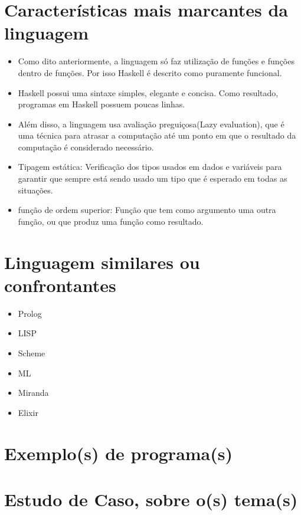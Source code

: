 \documentclass[
	article,			%
	11pt,				%
	oneside,			%
	a4paper,			%
	english,			%
	brazil,				%
	sumario=tradicional
	]{abntex2}
\begin{document}
    \chapter{Características mais marcantes da linguagem}

    \begin{itemize}
      \item Como dito anteriormente, a linguagem só faz utilização de funções e funções dentro de funções. Por isso
      Haskell é descrito como puramente funcional.
      \item Haskell possui uma sintaxe simples, elegante e concisa. Como resultado, programas em Haskell possuem 
      poucas linhas. 
      \item Além disso, a linguagem usa avaliação preguiçosa(Lazy evaluation), que é uma técnica para atrasar a computação 
      até um ponto em que o resultado da computação é considerado necessário.
      \item Tipagem estática: Verificação dos tipos usados em dados e variáveis para 
      garantir que sempre está sendo usado um tipo que é esperado em todas as situações. 
      \item função de ordem superior: Função que tem como argumento uma outra função, ou que produz 
      uma função como resultado.
    \end{itemize}

    \chapter{Linguagem similares ou confrontantes}

    \begin{itemize}
      \item Prolog
      \item LISP 
      \item Scheme 
      \item ML 
      \item Miranda 
      \item Elixir 
    \end{itemize}

    \chapter{Exemplo(s) de programa(s)}
    \chapter{Estudo de Caso, sobre o(s) tema(s)}
\end{document}
